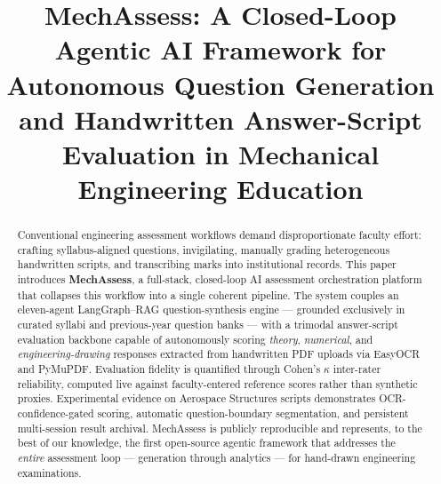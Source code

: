 \documentclass[conference]{IEEEtran}
\begin{document}
\title{MechAssess: A Closed-Loop Agentic AI Framework for Autonomous Question Generation and Handwritten Answer-Script Evaluation in Mechanical Engineering Education}

\author{
    \and
}

\maketitle

\begin{abstract}
Conventional engineering assessment workflows demand disproportionate faculty effort: crafting syllabus-aligned questions, invigilating, manually grading heterogeneous handwritten scripts, and transcribing marks into institutional records. This paper introduces \textbf{MechAssess}, a full-stack, closed-loop AI assessment orchestration platform that collapses this workflow into a single coherent pipeline. The system couples an eleven-agent LangGraph–RAG question-synthesis engine — grounded exclusively in curated syllabi and previous-year question banks — with a trimodal answer-script evaluation backbone capable of autonomously scoring \emph{theory}, \emph{numerical}, and \emph{engineering-drawing} responses extracted from handwritten PDF uploads via EasyOCR and PyMuPDF. Evaluation fidelity is quantified through Cohen's $\kappa$ inter-rater reliability, computed live against faculty-entered reference scores rather than synthetic proxies. Experimental evidence on Aerospace Structures scripts demonstrates OCR-confidence-gated scoring, automatic question-boundary segmentation, and persistent multi-session result archival. MechAssess is publicly reproducible and represents, to the best of our knowledge, the first open-source agentic framework that addresses the \emph{entire} assessment loop — generation through analytics — for hand-drawn engineering examinations.
\end{abstract}
\end{document}
